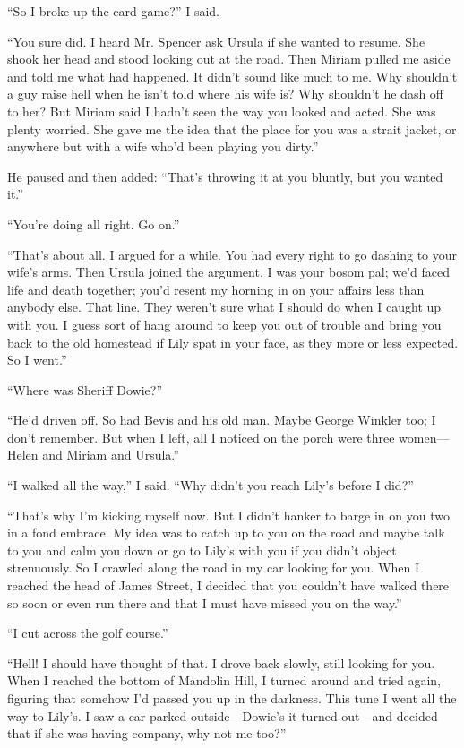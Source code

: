 \documentclass{novel}
\begin{document}
{“So I broke up the card game?” I said.

“You sure did. I heard Mr. Spencer ask Ursula if she wanted to resume. She shook her head and stood looking out at the road. Then Miriam pulled me aside and told me what had happened. It didn’t sound like much to me. Why shouldn’t a guy raise hell when he isn’t told where his wife is? Why shouldn’t he dash off to her? But Miriam said I hadn’t seen the way you looked and acted. She was plenty worried. She gave me the idea that the place for you was a strait jacket, or anywhere but with a wife who’d been playing you dirty.”

He paused and then added: “That’s throwing it at you bluntly, but you wanted it.”

“You’re doing all right. Go on.”

“That’s about all. I argued for a while. You had every right to go dashing to your wife’s arms. Then Ursula joined the argument. I was your bosom pal; we’d faced life and death together; you’d resent my horning in on your affairs less than anybody else. That line. They weren’t sure what I should do when I caught up with you. I guess sort of hang around to keep you out of trouble and bring you back to the old homestead if Lily spat in your face, as they more or less expected. So I went.”

“Where was Sheriff Dowie?”

“He’d driven off. So had Bevis and his old man. Maybe George Winkler too; I don’t remember. But when I left, all I noticed on the porch were three women—Helen and Miriam and Ursula.”

“I walked all the way,” I said. “Why didn’t you reach Lily’s before I did?”

“That’s why I’m kicking myself now. But I didn’t hanker to barge in on you two in a fond embrace. My idea was to catch up to you on the road and maybe talk to you and calm you down or go to Lily’s with you if you didn’t object strenuously. So I crawled along the road in my car looking for you. When I reached the head of James Street, I decided that you couldn’t have walked there so soon or even run there and that I must have missed you on the way.”

“I cut across the golf course.”

“Hell! I should have thought of that. I drove back slowly, still looking for you. When I reached the bottom of Mandolin Hill, I turned around and tried again, figuring that somehow I’d passed you up in the darkness. This tune I went all the way to Lily’s. I saw a car parked outside—Dowie’s it turned out—and decided that if she was having company, why not me too?”

}
\end{document}

